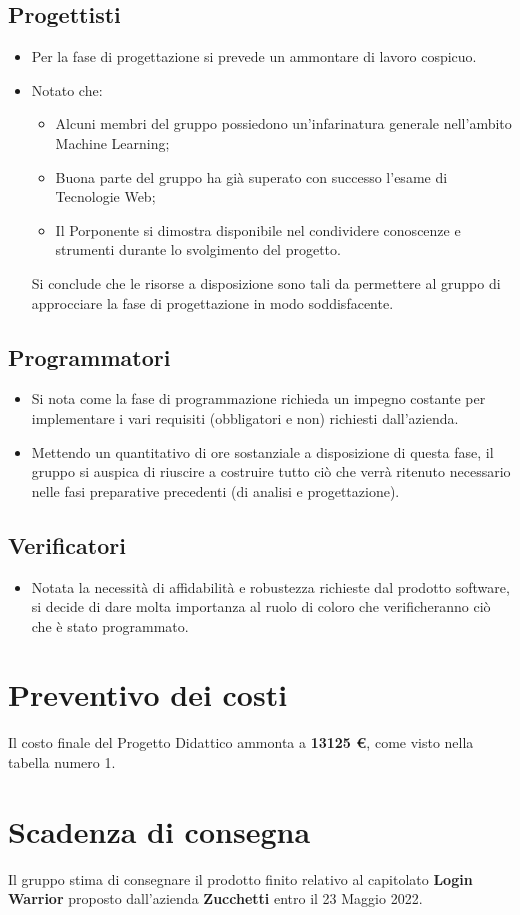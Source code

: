 \documentclass[11pt]{article}
\begin{document}
\subsection{Progettisti}
    \begin{itemize}
        \item Per la fase di progettazione si prevede un ammontare di lavoro cospicuo.
        \item Notato che:
            \begin{itemize}
                \item Alcuni membri del gruppo possiedono un'infarinatura generale nell'ambito Machine Learning;
                \item Buona parte del gruppo ha già superato con successo l'esame di Tecnologie Web;
                \item Il Porponente si dimostra disponibile nel condividere conoscenze e strumenti durante lo svolgimento del progetto.
            \end{itemize}
        Si conclude che le risorse a disposizione sono tali da permettere al gruppo di approcciare la fase di progettazione in modo soddisfacente.
    \end{itemize}
\subsection{Programmatori}
    \begin{itemize}
        \item Si nota come la fase di programmazione richieda un impegno costante per implementare i vari requisiti (obbligatori e non) richiesti dall'azienda.
        \item Mettendo un quantitativo di ore sostanziale a disposizione di questa fase, il gruppo si auspica di riuscire a costruire tutto ciò che verrà ritenuto necessario nelle fasi preparative precedenti (di analisi e progettazione).
    \end{itemize}
\subsection{Verificatori}
    \begin{itemize}
        \item Notata la necessità di affidabilità e robustezza richieste dal prodotto software, si decide di dare molta importanza al ruolo di coloro che verificheranno ciò che è stato programmato.
    \end{itemize}
\section{Preventivo dei costi}
Il costo finale del Progetto Didattico ammonta a \textbf{13125 €}, come visto nella tabella numero 1.
\section{Scadenza di consegna}
Il gruppo stima di consegnare il prodotto finito relativo al capitolato 
\textbf{Login Warrior} proposto dall'azienda 
\textbf{Zucchetti} entro il 23 Maggio 2022. 
\end{document}
